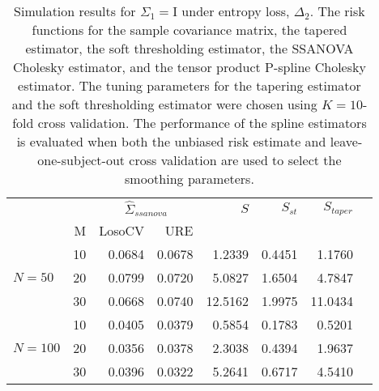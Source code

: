 \documentclass[12pt]{article}
\theoremstyle{definition}
\begin{document}
\begin{table}[ht]
\centering
\caption{Simulation results for $\Sigma_1 = \mathrm{I}$ under entropy loss, $\Delta_2$. The risk functions for the sample covariance matrix, the tapered estimator, the soft thresholding estimator, the SSANOVA Cholesky estimator, and the tensor product P-spline Cholesky estimator. The tuning parameters for the tapering estimator and the soft thresholding estimator were chosen using $K = 10$-fold cross validation. The performance of the spline estimators is evaluated when both the unbiased risk estimate and leave-one-subject-out cross validation are used to select the smoothing parameters.}
\begin{tabular}{l|r|rrrrrr}
&  & \multicolumn{2}{c}{$\hat{\Sigma}_{ssanova}$} & $S$ & $S_{st}$ & $S_{taper}$ \\ 
&M & \mbox{LosoCV} & \mbox{URE} &  \\ 
  \hline
&    10 & 0.0684 & 	0.0678	&1.2339 & 0.4451 & 1.1760\\ 
$N = 50$ &    20 & 0.0799 & 	0.0720	&5.0827 & 1.6504 & 4.7847 \\ 
  &    30 & 0.0668 &	0.0740	 &12.5162  & 1.9975 & 11.0434 \\ 
   \hdashline
 &    10 & 0.0405 & 0.0379 & 0.5854  & 0.1783 & 0.5201 \\ 
$N = 100$ &    20 & 0.0356 &  0.0378 & 2.3038 & 0.4394 & 1.9637 \\ 
  &    30 & 0.0396 & 0.0322  &5.2641 & 0.6717 & 4.5410 \\ 
\end{tabular}
\end{table}


\end{document}
